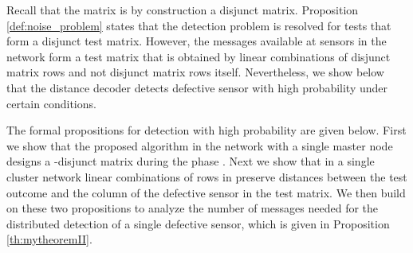 \documentclass[journal]{IEEEtran}
\begin{document}
Recall that the matrix  is by construction a disjunct matrix. Proposition \ref{def:noise_problem} states that the detection problem is resolved for tests that form a disjunct test matrix. However, the messages available at sensors in the network form a test matrix that is obtained by linear combinations of disjunct matrix rows and not disjunct matrix rows itself. Nevertheless, we show below that the distance decoder detects defective sensor with high probability under certain conditions. 

The formal propositions for detection with high probability are given below. First we show that the proposed algorithm in the network with a single master node designs a -disjunct matrix  during the phase . Next we show that in a single cluster network linear combinations of rows in  preserve distances between the test outcome and the column of the defective sensor in the test matrix. We then build on these two propositions to analyze the number of messages needed for the  distributed detection of a single defective sensor, which is given in Proposition \ref{th:mytheoremII}. 
\end{document}
